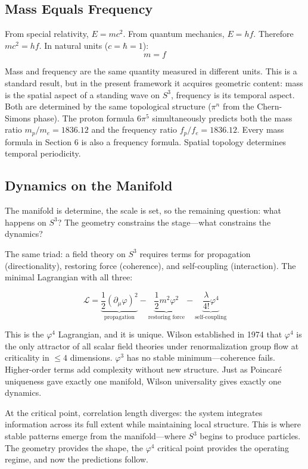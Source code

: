 \documentclass[12pt]{article}
\begin{document}
\subsection{Mass Equals Frequency}

From special relativity, $E = mc^2$. From quantum mechanics, $E = hf$. Therefore $mc^2 = hf$. In natural units ($c = \hbar = 1$):
$$m = f$$

Mass and frequency are the same quantity measured in different units. This is a standard result, but in the present framework it acquires geometric content: mass is the spatial aspect of a standing wave on $S^3$, frequency is its temporal aspect. Both are determined by the same topological structure ($\pi^n$ from the Chern-Simons phase). The proton formula $6\pi^5$ simultaneously predicts both the mass ratio $m_p/m_e = 1836.12$ and the frequency ratio $f_p/f_e = 1836.12$. Every mass formula in Section 6 is also a frequency formula. Spatial topology determines temporal periodicity.


\subsection{Dynamics on the Manifold}

The manifold is determine, the scale is set, so the remaining question: what happens on $S^3$? The geometry constrains the stage---what constrains the dynamics?

The same triad: a field theory on $S^3$ requires terms for propagation (directionality), restoring force (coherence), and self-coupling (interaction). The minimal Lagrangian with all three:

$$\mathcal{L} = \underbrace{\frac{1}{2}(\partial_\mu \varphi)^2}_{\text{propagation}} - \underbrace{\frac{1}{2}m^2\varphi^2}_{\text{restoring force}} - \underbrace{\frac{\lambda}{4!}\varphi^4}_{\text{self-coupling}}$$

This is the $\varphi^4$ Lagrangian, and it is unique. Wilson established in 1974 \cite{wilson1974} that $\varphi^4$ is the only attractor of all scalar field theories under renormalization group flow at criticality in $\leq 4$ dimensions. $\varphi^3$ has no stable minimum---coherence fails. Higher-order terms add complexity without new structure. Just as Poincar\'e uniqueness gave exactly one manifold, Wilson universality gives exactly one dynamics.

At the critical point, correlation length diverges: the system integrates information across its full extent while maintaining local structure. This is where stable patterns emerge from the manifold---where $S^3$ begins to produce particles. The geometry provides the shape, the $\varphi^4$ critical point provides the operating regime, and now the predictions follow.
\end{document}
